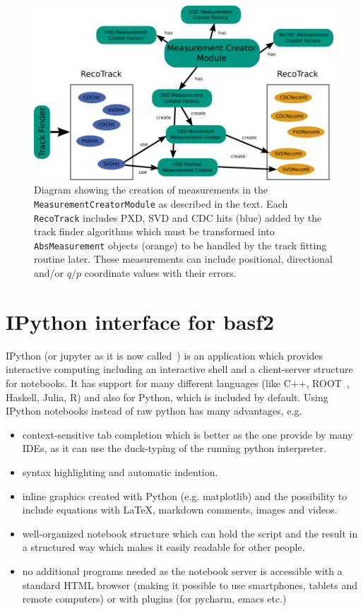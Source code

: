\begin{figure}
  \centering
  \includegraphics[width=\linewidth]{figures/vxd/measurementCreator.pdf}
  \caption[Diagram showing the creation of measurements.]{Diagram showing the creation of measurements in the \texttt{MeasurementCreatorModule} as described in the text. Each \texttt{RecoTrack} includes PXD, SVD and CDC hits (blue) added by the track finder algorithms which must be transformed into \texttt{AbsMeasurement} objects (orange) to be handled by the track fitting routine later. These measurements can include positional, directional and/or $q/p$ coordinate values with their errors.}
  \label{fig-measurement-creator}
\end{figure}


\section{IPython interface for basf2}

IPython (or jupyter as it is now called~\cite{jupyter}) is an application which provides interactive computing including an interactive shell and a client-server structure for notebooks. It has support for many different languages (like C++, ROOT~\cite{root_ipython}, Haskell, Julia, R) and also for Python, which is included by default. Using IPython notebooks instead of raw python has many advantages, e.g.
\begin{itemize}
  \item context-sensitive tab completion which is better as the one provide by many IDEs, as it can use the duck-typing of the running python interpreter.
  \item syntax highlighting and automatic indention.
  \item inline graphics created with Python (e.g. matplotlib) and the possibility to include equations with \LaTeX, markdown comments, images and videos.
  \item well-organized notebook structure which can hold the script and the result in a structured way which makes it easily readable for other people.
  \item no additional programs needed as the notebook server is accessible with a standard HTML browser (making it possible to use smartphones, tablets and remote computers) or with plugins (for pycharm, emacs etc.)
\end{itemize}

